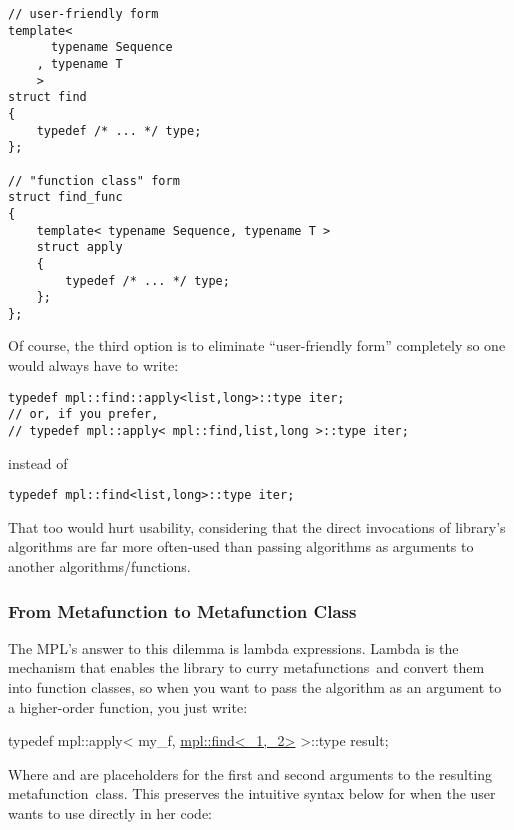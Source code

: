 \documentclass{kapproc}
\newcommand{\mfn}{meta\-func\-tion}
\newcommand{\mfns}{meta\-func\-tions}
\begin{document}
{\small
\begin{codesamp}\begin{verbatim}
// user-friendly form
template<
      typename Sequence
    , typename T
    >
struct find
{
    typedef /* ... */ type;
};

// "function class" form
struct find_func
{
    template< typename Sequence, typename T >
    struct apply
    {
        typedef /* ... */ type;
    };
};
\end{verbatim}
\end{codesamp}
}

Of course, the third option is to eliminate ``user-friendly form''
completely so one would always have to write:

{\small
\begin{codesamp}\begin{verbatim}
typedef mpl::find::apply<list,long>::type iter;
// or, if you prefer,
// typedef mpl::apply< mpl::find,list,long >::type iter;
\end{verbatim}
\end{codesamp}
}

instead of 

{\small
\begin{codesamp}\begin{verbatim}
typedef mpl::find<list,long>::type iter;
\end{verbatim}
\end{codesamp}
}

That too would hurt usability, considering that the direct 
invocations of library's algorithms are far more often-used than 
passing algorithms as arguments to another algorithms/functions. 

\subsubsection{From Metafunction to Metafunction Class}

The MPL's answer to this dilemma is lambda expressions.  Lambda is the
mechanism that enables the library to curry \mfns\ and convert them
into function classes, so when you want to pass the 
algorithm as an argument to a higher-order function, you just write:

{\small
\begin{codesamp}
typedef mpl::apply< my\_f, \underline{mpl::find<\_1,\_2>} >::type result;
\end{codesamp}
}

Where  and  are placeholders for the first and
second arguments to the resulting \mfn\ class. This preserves the
intuitive syntax below for when the user wants to use 
directly in her code:
\end{document}
